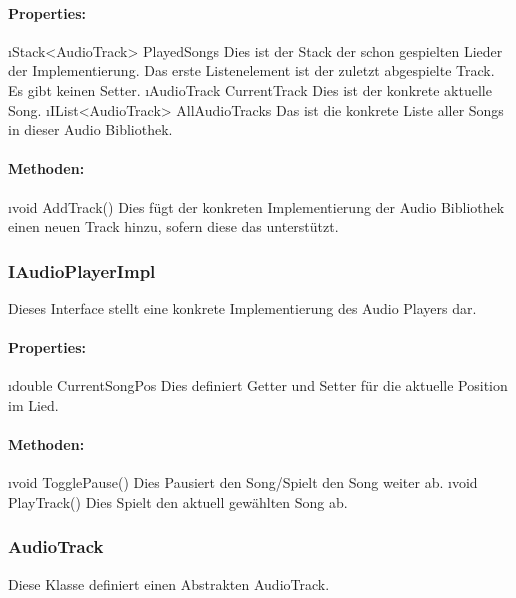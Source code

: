 \documentclass[../entwurf.tex]{subfiles}
\begin{document}
				\paragraph{Properties:}
					\begin{itemize}
						\i{Stack<AudioTrack> PlayedSongs} Dies ist der Stack der schon gespielten Lieder der Implementierung.
						Das erste Listenelement ist der zuletzt abgespielte Track. Es gibt keinen Setter.
						\i{AudioTrack CurrentTrack} Dies ist der konkrete aktuelle Song.
						\i{IList<AudioTrack> AllAudioTracks} Das ist die konkrete Liste aller Songs in dieser Audio Bibliothek.
					\end{itemize}
				\paragraph{Methoden:}
					\begin{itemize}
						\i{void AddTrack()} Dies fügt der konkreten Implementierung der Audio Bibliothek einen neuen Track hinzu, sofern
						diese das unterstützt.
					\end{itemize}
			\subsubsection{IAudioPlayerImpl}
				Dieses Interface stellt eine konkrete Implementierung des Audio Players dar.
				\paragraph{Properties:}
					\begin{itemize}
						\i{double CurrentSongPos} Dies definiert Getter und Setter für die aktuelle Position im Lied.
					\end{itemize}
				\paragraph{Methoden:}
					\begin{itemize}
						\i{void TogglePause()} Dies Pausiert den Song/Spielt den Song weiter ab.
						\i{void PlayTrack()} Dies Spielt den aktuell gewählten Song ab.
					\end{itemize}
			\subsubsection{AudioTrack}
				Diese Klasse definiert einen Abstrakten AudioTrack.
\end{document}
